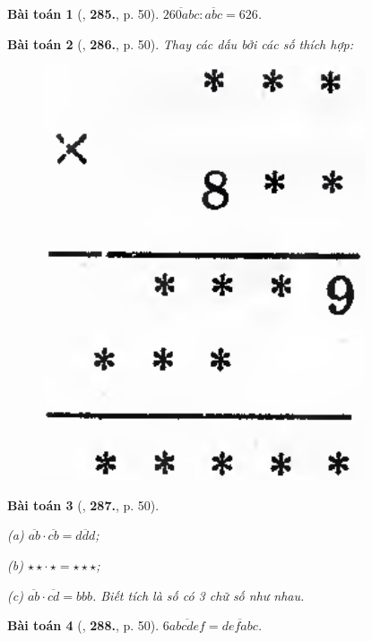 \documentclass{article}
\numberwithin{equation}{section}
\newtheorem{baitoan}{Bài toán}
\begin{document}
\begin{baitoan}[\cite{Binh_Toan_6_tap_1}, \textbf{285.}, p. 50]
	$\overline{260abc}:\overline{abc} = 626$.
\end{baitoan}

\begin{baitoan}[\cite{Binh_Toan_6_tap_1}, \textbf{286.}, p. 50]
	Thay các dấu {\bf*} bởi các số thích hợp:
	\begin{figure}[H]
		\centering
		\includegraphics[scale=0.13]{Binh_286_p_50}
	\end{figure}
\end{baitoan}

\begin{baitoan}[\cite{Binh_Toan_6_tap_1}, \textbf{287.}, p. 50]
	\begin{enumerate*}
		\item[(a)] $\overline{ab}\cdot\overline{cb} = \overline{ddd}$;
		\item[(b)] $\star\star\cdot\,\star = \star\star\star$;
		\item[(c)] $\overline{ab}\cdot\overline{cd} = bbb$. Biết tích là số có 3 chữ số như nhau.
	\end{enumerate*}
\end{baitoan}

\begin{baitoan}[\cite{Binh_Toan_6_tap_1}, \textbf{288.}, p. 50]
	$6\overline{abcdef} = \overline{defabc}$.
\end{baitoan}
\end{document}
